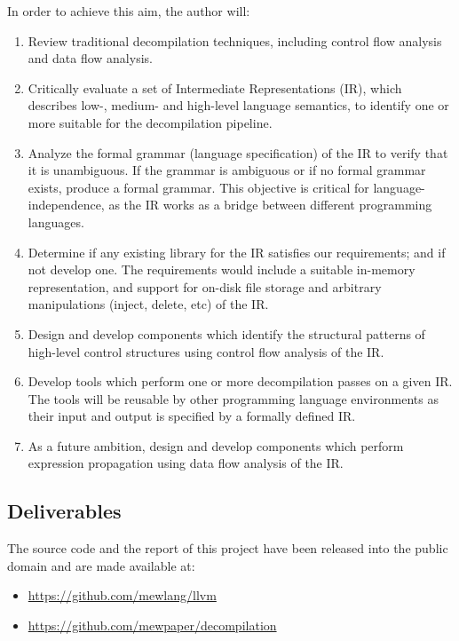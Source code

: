 \documentclass[12pt, a4paper]{article}
\begin{document}
In order to achieve this aim, the author will:
\begin{enumerate}
	\item Review traditional decompilation techniques, including control flow analysis and data flow analysis. \label{decomp_research_obj}
	\item Critically evaluate a set of Intermediate Representations (IR), which describes low-, medium- and high-level language semantics, to identify one or more suitable for the decompilation pipeline. \label{ir_evaluation_obj}
	\item Analyze the formal grammar (language specification) of the IR to verify that it is unambiguous. If the grammar is ambiguous or if no formal grammar exists, produce a formal grammar. This objective is critical for language-independence, as the IR works as a bridge between different programming languages. \label{formal_ir_obj}
	\item Determine if any existing library for the IR satisfies our requirements; and if not develop one. The requirements would include a suitable in-memory representation, and support for on-disk file storage and arbitrary manipulations (inject, delete, etc) of the IR. \label{ir_lib_obj}
	\item Design and develop components which identify the structural patterns of high-level control structures using control flow analysis of the IR. \label{structure_lib_obj}
	\item Develop tools which perform one or more decompilation passes on a given IR. The tools will be reusable by other programming language environments as their input and output is specified by a formally defined IR. \label{reconstruct_tool_obj}
	\item As a future ambition, design and develop components which perform expression propagation using data flow analysis of the IR. \label{expression_lib_obj}
\end{enumerate}


\subsection{Deliverables}


The source code and the report of this project have been released into the public domain \cite{cc0} and are made available at:
\begin{itemize}
	\item \url{https://github.com/mewlang/llvm}
	\item \url{https://github.com/mewpaper/decompilation}
\end{itemize}
\end{document}
